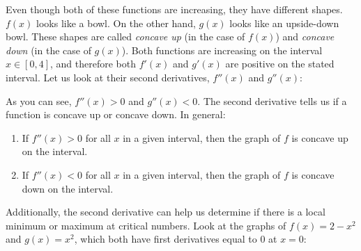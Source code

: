 Even though both of these functions are increasing, they have different shapes. 
$f(x)$ looks like a bowl. On the other hand, $g(x)$ looks like an upside-down 
bowl. These shapes are called \textit{concave up} (in the case of $f(x)$) and 
\textit{concave down} (in the case of $g(x)$). Both functions are increasing on 
the interval $x \in [0, 4]$, and therefore both $f'(x)$ and $g'(x)$ are 
positive on the stated interval. Let us look at their second derivatives, $f''(x
)$ and $g''(x)$:
\begin{figure}
\centering
{}
\end{figure}

As you can see, $f''(x) >0$ and $g''(x)<0$. The second derivative tells us if 
a function is concave up or concave down. In general:
\begin{enumerate}
\item If $f''(x)>0$ for all $x$ in a given interval, then the graph of $f$ is 
concave up on the interval.
\item If $f''(x)<0$ for all $x$ in a given interval, then the graph of $f$ is 
concave down on the interval.
\end{enumerate}

Additionally, the second derivative can help us determine if there is a local 
minimum or maximum at critical numbers. Look at the graphs of $f(x) = 2-x^2$ 
and $g(x) = x^2$, which both have first derivatives equal to $0$ at $x=0$:
\begin{figure}
\centering
{}
\end{figure}

